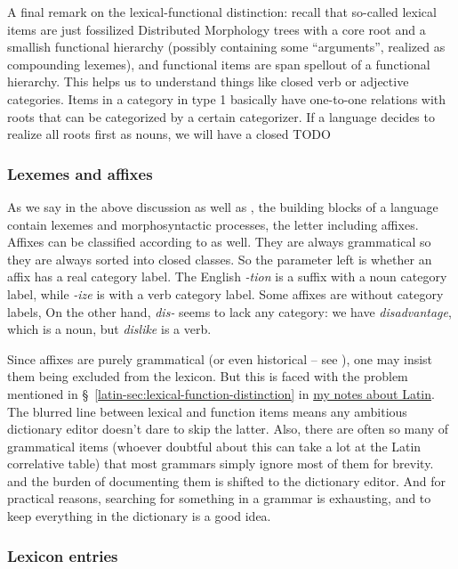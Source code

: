 \documentclass[UTF8, a4paper, oneside, scheme=plain]{ctexart}
\newcommand*{\citesec}[1]{\S~{#1}}
\newcommand*{\corpus}[1]{\emph{#1}}
\newcommand{\latin}{\href{../Latin/latin-notes.pdf}{my notes about Latin}}
\begin{document}
A final remark on the lexical-functional distinction: 
recall that so-called lexical items 
are just fossilized Distributed Morphology trees with a core root 
and a smallish functional hierarchy 
(possibly containing some ``arguments'', realized as compounding lexemes),
and functional items are span spellout of a functional hierarchy.
This helps us to understand things like closed verb or adjective categories.
Items in a category in type 1 basically have one-to-one relations with 
roots that can be categorized by a certain categorizer.
If a language decides to realize all roots first as nouns,
we will have a closed \citep{cinque2009cartography} TODO

\subsubsection{Lexemes and affixes}

As we say in the above discussion as well as ,
the building blocks of a language contain lexemes and morphosyntactic processes,
the letter including affixes.
Affixes can be classified according to  as well.
They are always grammatical 
so they are always sorted into closed classes.
So the parameter left is whether an affix has a real category label.
The English \corpus{-tion} is a suffix with a noun category label,
while \corpus{-ize} is with a verb category label.
Some affixes are without category labels,
On the other hand, \corpus{dis-} seems to lack any category:
we have \corpus{disadvantage}, which is a noun,
but \corpus{dislike} is a verb.

Since affixes are purely grammatical
(or even historical -- see ),
one may insist them being excluded from the lexicon.
But this is faced with the problem mentioned 
in \citesec{\ref{latin-sec:lexical-function-distinction}} in \latin.
The blurred line between lexical and function items means 
any ambitious dictionary editor doesn't dare to skip the latter.
Also, there are often so many of grammatical items 
(whoever doubtful about this can take a lot at the Latin correlative table)
that most grammars simply ignore most of them for brevity.
and the burden of documenting them is shifted to the dictionary editor.
And for practical reasons,
searching for something in a grammar is exhausting,
and to keep everything in the dictionary is a good idea.

\subsubsection{Lexicon entries}
\end{document}
